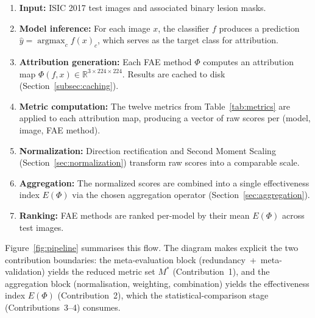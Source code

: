 \begin{enumerate}
    \item \textbf{Input:} ISIC 2017 test images and associated binary lesion
    masks.
    \item \textbf{Model inference:} For each image $x$, the classifier $f$
    produces a prediction $\hat{y} = \operatorname{argmax}_c f(x)_c$, which
    serves as the target class for attribution.
    \item \textbf{Attribution generation:} Each FAE method $\Phi$ computes an
    attribution map $\Phi(f, x) \in \mathbb{R}^{3 \times 224 \times 224}$.
    Results are cached to disk (Section~\ref{subsec:caching}).
    \item \textbf{Metric computation:} The twelve metrics from
    Table~\ref{tab:metrics} are applied to each attribution map, producing a
    vector of raw scores per (model, image, FAE method).
    \item \textbf{Normalization:} Direction rectification and Second Moment
    Scaling (Section~\ref{sec:normalization}) transform raw scores into a
    comparable scale.
    \item \textbf{Aggregation:} The normalized scores are combined into a
    single effectiveness index $E(\Phi)$ via the chosen aggregation operator
    (Section~\ref{sec:aggregation}).
    \item \textbf{Ranking:} FAE methods are ranked per-model by their mean
    $E(\Phi)$ across test images.
\end{enumerate}

Figure~\ref{fig:pipeline} summarises this flow. The diagram makes explicit
the two contribution boundaries: the meta-evaluation block
(redundancy~+~meta-validation) yields the reduced metric set $M^{*}$
(Contribution~1), and the aggregation block (normalisation, weighting,
combination) yields the effectiveness index $E(\Phi)$ (Contribution~2),
which the statistical-comparison stage (Contributions~3--4) consumes.

